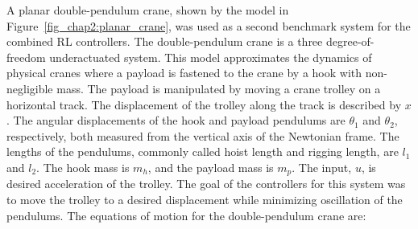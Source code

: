 A planar double-pendulum crane, shown by the model in Figure~\ref{fig_chap2:planar_crane}, was used as a second benchmark system for the combined RL controllers.
The double-pendulum crane is a three degree-of-freedom underactuated system.
This model approximates the dynamics of physical cranes where a payload is fastened to the crane by a hook with non-negligible mass. The payload is manipulated by moving a crane trolley on a horizontal track.
The displacement of the trolley along the track is described by $x$. The angular displacements of the hook and payload pendulums are $\theta_1$ and $\theta_2$, respectively, both measured from the vertical axis of the Newtonian frame. The lengths of the pendulums, commonly called hoist length and rigging length, are $l_1$ and $l_2$. The hook mass is $m_h$, and the payload mass is $m_p$. The input, $u$, is desired acceleration of the trolley. The goal of the controllers for this system was to move the trolley to a desired displacement while minimizing oscillation of the pendulums.
%
The equations of motion for the double-pendulum crane are:
%
